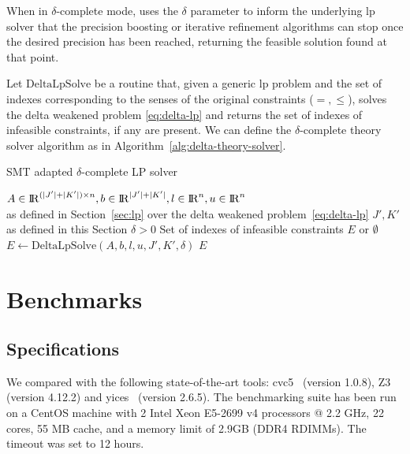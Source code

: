 \documentclass[runningheads]{llncs}
\begin{document}
When in $\delta$-complete mode, \dlinear uses the $\delta$ parameter to inform the underlying \gls{lp} solver that the precision boosting or iterative refinement algorithms can stop once the desired precision has been reached, returning the feasible solution found at that point.

Let $\text{DeltaLpSolve}$ be a routine that, given a generic \gls{lp} problem and the set of indexes corresponding to the senses of the original constraints ($=, \le$), solves the delta weakened problem \eqref{eq:delta-lp} and returns the set of indexes of infeasible constraints, if any are present.
We can define the $\delta$-complete theory solver algorithm as in Algorithm~\ref{alg:delta-theory-solver}.

\begin{algorithm}
    \caption{SMT adapted $\delta$-complete LP solver}\label{alg:delta-theory-solver}
    \begin{algorithmic}
        \Require $A \in {\rm I\!R}^{(|J'| + |K'|) \times n}, b \in {\rm I\!R}^{|J'| + |K'|}, l \in {\rm I\!R}^n, u \in {\rm I\!R}^n$ \\
        \qquad as defined in Section~\ref{sec:lp} over the delta weakened problem~\eqref{eq:delta-lp}
        \Require $J', K'$ as defined in this Section
        \Require $\delta > 0$
        \Ensure Set of indexes of infeasible constraints $E$ or $\emptyset$
        \State $E \gets \text{DeltaLpSolve}(A, b, l, u, J', K', \delta)$ 
        \State \Return $E$
    \end{algorithmic}
\end{algorithm}

\section{Benchmarks}
\label{sec:benchmarks}
\subsection*{Specifications}

We compared \dlinear with the following state-of-the-art tools: cvc5~\cite{ref:cvc5} (version 1.0.8), Z3~\cite{ref:z3} (version 4.12.2) and yices~\cite{ref:yices} (version 2.6.5).
The benchmarking suite has been run on a CentOS machine with 2 Intel Xeon E5-2699 v4 processors @ 2.2 GHz, 22 cores, 55 MB cache, and a memory limit of 2.9GB (DDR4 RDIMMs).
The timeout was set to 12 hours.
\end{document}
